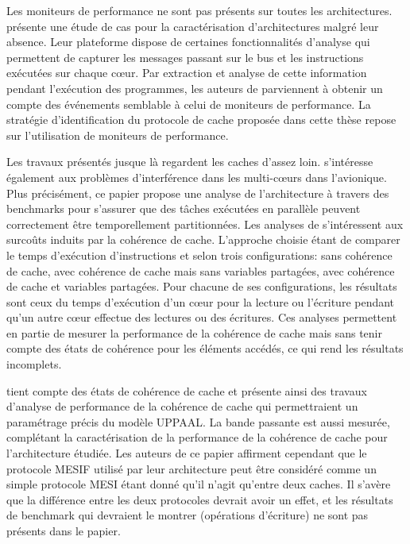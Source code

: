 Les moniteurs de performance ne sont pas présents sur toutes les architectures.
\cite{palomo_et_al:LIPIcs:2020:12378} présente une étude de cas pour la
caractérisation d'architectures malgré leur absence. Leur plateforme dispose de
certaines fonctionnalités d'analyse qui permettent de capturer les messages
passant sur le bus et les instructions exécutées sur chaque cœur. Par
extraction et analyse de cette information pendant l'exécution des programmes,
les auteurs de \cite{palomo_et_al:LIPIcs:2020:12378} parviennent
à obtenir un compte des événements semblable à celui de moniteurs de
performance.
La stratégie d'identification du protocole de cache proposée dans cette thèse
repose sur l'utilisation de moniteurs de performance. 

Les travaux présentés jusque là regardent les caches d'assez loin.
\cite{Nowotsch2012LeveragingMC} s'intéresse également
aux problèmes d'interférence dans les multi-cœurs dans l'avionique.
Plus précisément, ce papier propose une
analyse de l'architecture à travers des benchmarks pour s'assurer que des
tâches exécutées en parallèle peuvent correctement être temporellement
partitionnées. 
Les analyses de \cite{Nowotsch2012LeveragingMC} s'intéressent aux surcoûts
induits par la cohérence de cache. L'approche choisie étant de comparer le temps
d'exécution d'instructions \loadinstr{} et \storeinstr{} selon
trois configurations: sans
cohérence de cache, avec cohérence de cache mais sans variables partagées, avec
cohérence de cache et variables partagées. Pour chacune de ses configurations,
les résultats sont ceux du temps d'exécution d'un cœur pour la lecture ou
l'écriture pendant qu'un autre cœur effectue des lectures ou des écritures.
Ces analyses permettent en partie
de mesurer la performance de la cohérence de
cache mais sans tenir compte des états de cohérence
pour les éléments accédés,
ce qui rend les résultats incomplets.

\cite{10.1109/PACT.2009.22} tient compte des états de cohérence de cache et 
présente ainsi des travaux d'analyse de performance de la cohérence de cache
qui permettraient un paramétrage précis du modèle UPPAAL.
La bande passante est
aussi mesurée, complétant la caractérisation de la performance de la cohérence
de cache pour l'architecture étudiée. Les auteurs de ce papier affirment
cependant que le protocole MESIF utilisé par leur architecture peut être
considéré comme un simple protocole MESI étant donné qu'il n'agit qu'entre deux
caches. Il s'avère que la différence entre les deux protocoles devrait avoir un
effet, et les résultats de benchmark qui devraient le montrer (opérations
d'écriture) ne sont pas présents dans le papier.

